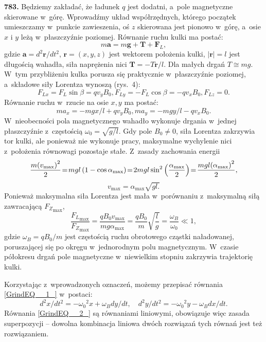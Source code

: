 {\begin{dwieszpalty}
\textbf{783.}
Będziemy zakładać, że ładunek $q$ jest dodatni, a~pole magnetyczne skierowane w~górę. Wprowadźmy układ współrzędnych, którego początek umieszczamy w~punkcie zawieszenia, oś $z$ skierowana jest pionowo w~górę, a~osie $x$ i $y$ leżą w~płaszczyźnie poziomej. Równanie ruchu kulki ma postać:
\[m\boldsymbol{a}=m\boldsymbol{g}+\boldsymbol{T}+{\boldsymbol{F}}_L,\] 
gdzie $\boldsymbol{a}={d^2\boldsymbol{r}}/{dt^2}$,  $\boldsymbol{r}=(x,y,z)$ jest wektorem położenia kulki, $\left|\boldsymbol{r}\right|=l$ jest długością wahadła, siła naprężenia nici $\boldsymbol{T}=-T{\boldsymbol{r}}/{l}$. Dla małych drgań $T\cong mg$. W~tym przybliżeniu kulka porusza się praktycznie w~płaszczyźnie poziomej, a~składowe siły Lorentza wynoszą (rys.~4):
\[F_{Lx}=F_L\sin \beta =qv_yB_0,  F_{Ly}=-F_L\cos \beta =-qv_xB_0,  F_{Lz}=0.\] 
Równanie ruchu w~rzucie na osie $x,y$ ma postać:
\begin{equation} \label{GrindEQ__1_} 
ma_x=-mg{x}/{l}+qv_yB_0,        ma_y=-mg{y}/{l}-qv_xB_0. 
\end{equation} 
W~nieobecności pola magnetycznego wahadło wykonuje drgania w~jednej płaszczyźnie z~częstością ${\omega }_0=\sqrt{{g}/{l}}$. Gdy pole $B_0\neq 0$, siła Lorentza zakrzywia tor kulki, ale ponieważ nie wykonuje pracy, maksymalne wychylenie nici z~położenia równowagi pozostaje stałe. Z~zasady zachowania energii
\[\thickmuskip2mu\frac{m{(v_{\max})}^2}{2}=mgl\left(1-\cos \alpha _{\max}\right)=2mgl\sin^2\left(\frac{{\alpha }_{\max}}{2}\right)=\frac{mgl{\left({\alpha }_{\max}\right)}^2}{2},\] 
\[v_{\max}={\alpha }_{\max}\sqrt{gl.}\] 
Ponieważ maksymalna siła Lorentza jest mała w~porównaniu z~maksymalną siłą zawracającą ${F_Z}_{\max}$,
\[\frac{{F_L}_{\max}}{{F_Z}_{\max}}=\frac{qB_0v_{\max}}{mg{\alpha }_{\max}}=\frac{qB_0}{m}\sqrt{\frac{l}{g}}=\frac{{\omega }_B}{{\omega }_0}\ll 1,\] 
gdzie ${\omega }_B={qB_0}/{m}$ jest częstością ruchu obrotowego cząstki naładowanej, poruszającej się po okręgu w~jednorodnym polu magnetycznym. W~czasie półokresu drgań pole magnetyczne w~niewielkim stopniu zakrzywia trajektorię kulki.

Korzystając z~wprowadzonych oznaczeń, możemy przepisać równania \eqref{GrindEQ__1_} w~postaci:
\begin{equation} \label{GrindEQ__2_} 
{d^2x}/{dt^2}=-{{\omega }_0}^2x+{\omega }_B{dy}/{dt},  \quad      {d^2y}/{dt^2}=-{{\omega }_0}^2y-{\omega }_B{dx}/{dt}. 
\end{equation} 
Równania \eqref{GrindEQ__2_} są równaniami liniowymi, obowiązuje więc zasada superpozycji -- dowolna kombinacja liniowa dwóch rozwiązań tych równań jest też rozwiązaniem.




\end{dwieszpalty}}
